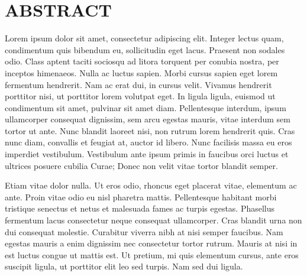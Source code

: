 %
%
%

\chapter*{ABSTRACT}

\pagestyle{plain} %
\setcounter{page}{2}

\indent  Lorem ipsum dolor sit amet, consectetur adipiscing elit. Integer lectus quam, condimentum quis bibendum eu, sollicitudin eget lacus. Praesent non sodales odio. Class aptent taciti sociosqu ad litora torquent per conubia nostra, per inceptos himenaeos. Nulla ac luctus sapien. Morbi cursus sapien eget lorem fermentum hendrerit. Nam ac erat dui, in cursus velit. Vivamus hendrerit porttitor nisi, ut porttitor lorem volutpat eget. In ligula ligula, euismod ut condimentum sit amet, pulvinar sit amet diam. Pellentesque interdum, ipsum ullamcorper consequat dignissim, sem arcu egestas mauris, vitae interdum sem tortor ut ante. Nunc blandit laoreet nisi, non rutrum lorem hendrerit quis. Cras nunc diam, convallis et feugiat at, auctor id libero. Nunc facilisis massa eu eros imperdiet vestibulum. Vestibulum ante ipsum primis in faucibus orci luctus et ultrices posuere cubilia Curae; Donec non velit vitae tortor blandit semper.

Etiam vitae dolor nulla. Ut eros odio, rhoncus eget placerat vitae, elementum ac ante. Proin vitae odio eu nisl pharetra mattis. Pellentesque habitant morbi tristique senectus et netus et malesuada fames ac turpis egestas. Phasellus fermentum lacus consectetur neque consequat ullamcorper. Cras blandit urna non dui consequat molestie. Curabitur viverra nibh at nisi semper faucibus. Nam egestas mauris a enim dignissim nec consectetur tortor rutrum. Mauris at nisi in est luctus congue ut mattis est. Ut pretium, mi quis elementum cursus, ante eros suscipit ligula, ut porttitor elit leo sed turpis. Nam sed dui ligula.

 

\pagebreak{}
